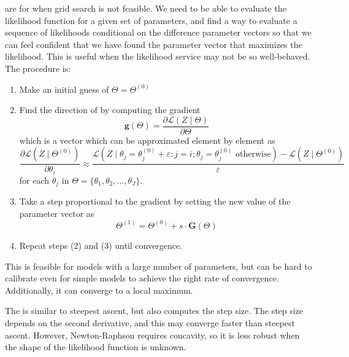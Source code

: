 \documentclass[10pt]{article}
\begin{document}
\begin{definition}
	 are for when grid search is not feasible. We need to be able to evaluate the likelihood function for a given set of parameters, and find a way to evaluate a sequence of likelihoods conditional on the difference parameter vectors so that we can feel confident that we have found the parameter vector that maximizes the likelihood. This is useful when the likelihood service may not be so well-behaved. The procedure is:
	\begin{enumerate}
		\item Make an initial guess of $\Theta = \Theta^{(0)}$
		\item Find the direction of  by computing the gradient\[\bm{g}(\Theta) = \frac{\partial \mathcal{L}(Z\mid \Theta)}{\partial \Theta}\]which is a vector which can be approximated element by element as\[\frac{\partial \mathcal{L}(Z\mid \Theta^{(0)})}{\partial \theta_i} \approx \frac{\mathcal{L}(Z\mid \theta_j = \theta_j^{(0)} + \varepsilon : j = i; \theta_j = \theta^{(0)}_j \text{ otherwise}) - \mathcal{L}(Z \mid \Theta^{(0)})}{\varepsilon}\]for each $\theta_j$ in $\Theta = \{\theta_1,\theta_2,\dots,\theta_J\}$.
		\item Take a step proportional to the gradient by setting the new value of the parameter vector as \[\Theta^{(1)} = \Theta^{(0)} + s \cdot \bm{G}(\Theta)\]
		\item Repeat steps (2) and (3) until convergence.
	\end{enumerate}	
\end{definition}

\begin{remark}
	This is feasible for models with a large number of parameters, but can be hard to calibrate even for simple models to achieve the right rate of convergence. Additionally, it can converge to a local maximum.
\end{remark}

\begin{definition}
	The  is similar to steepest ascent, but also computes the step size. The step size depends on the second derivative, and this may converge faster than steepest ascent. However, Newton-Raphson requires concavity, so it is less robust when the shape of the likelihood function is unknown.
\end{definition}
\end{document}
